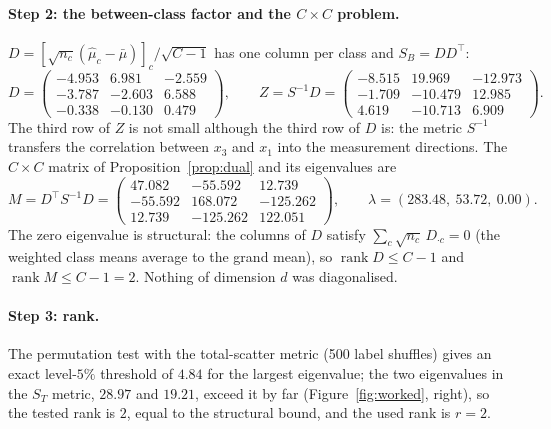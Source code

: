\documentclass[11pt,a4paper]{article}
\theoremstyle{plain}
\theoremstyle{definition}
\theoremstyle{remark}
\newcommand{\rank}{\operatorname{rank}}
\newcommand{\T}{\top}
\begin{document}
\paragraph{Step 2: the between-class factor and the $C\times C$ problem.}
$D=[\sqrt{n_c}(\hat\mu_c-\bar\mu)]_c/\sqrt{C-1}$ has one column per class and
$S_B=DD^\T$:
\[
D=\begin{pmatrix}-4.953&6.981&-2.559\\-3.787&-2.603&6.588\\-0.338&-0.130&0.479\end{pmatrix},\qquad
Z=S^{-1}D=\begin{pmatrix}-8.515&19.969&-12.973\\-1.709&-10.479&12.985\\4.619&-10.713&6.909\end{pmatrix}.
\]
The third row of $Z$ is not small although the third row of $D$ is: the
metric $S^{-1}$ transfers the correlation between $x_3$ and $x_1$ into the
measurement directions. The $C\times C$ matrix of
Proposition~\ref{prop:dual} and its eigenvalues are
\[
M=D^\T S^{-1}D=\begin{pmatrix}47.082&-55.592&12.739\\-55.592&168.072&-125.262\\12.739&-125.262&122.051\end{pmatrix},\qquad
\lambda=(283.48,\ 53.72,\ 0.00).
\]
The zero eigenvalue is structural: the columns of $D$ satisfy
$\sum_c\sqrt{n_c}\,D_{\cdot c}=0$ (the weighted class means average to the
grand mean), so $\rank D\le C-1$ and $\rank M\le C-1=2$. Nothing of
dimension $d$ was diagonalised.

\paragraph{Step 3: rank.} The permutation test with the total-scatter
metric (500 label shuffles) gives an exact level-$5\%$ threshold of $4.84$
for the largest eigenvalue; the two eigenvalues in the $S_T$ metric, $28.97$ and
$19.21$, exceed it by far (Figure~\ref{fig:worked}, right), so the tested
rank is $2$, equal to the structural bound, and the used rank is $r=2$.
\end{document}
